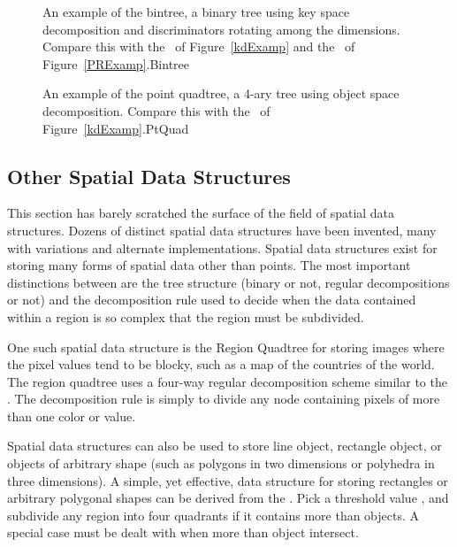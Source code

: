 \begin{figure}
\vspace{-\bigskipamount}
{An example of the bintree, a binary tree using key space
decomposition and discriminators rotating among the dimensions.
Compare this with the \KDtree\ of Figure~\ref{kdExamp} and the
\PRquad\ of Figure~\ref{PRExamp}.}{Bintree}
\bigskip
\end{figure}

\begin{figure}
\vspace{-\bigskipamount}
\vspace{-\medskipamount}
{An example of the point quadtree, a 4-ary tree using object space
decomposition.
Compare this with the \PRquad\ of Figure~\ref{kdExamp}.}{PtQuad}
\smallskip
\end{figure}

\newpage

\subsection{Other Spatial Data Structures}
\label{OtherSpatial}

This section has barely scratched the surface of the field of spatial
data structures.
Dozens of distinct spatial data structures have been
invented, many with variations and alternate implementations.
Spatial data structures exist for storing many forms of spatial data
other than points.
The most important distinctions between are the tree structure
(binary or not, regular decompositions or not) and the decomposition
rule used to decide when the data contained within a region is so
complex that the region must be subdivided.

One such spatial data structure is the Region
Quadtree for storing images where the pixel values tend to be
blocky, such as a map of the countries of the world.
The region quadtree uses a four-way regular decomposition scheme
similar to the \PRquad.
The decomposition rule is simply to divide any node containing pixels
of more than one color or value.

Spatial data structures can also be used to store line object,
rectangle object, or objects of arbitrary shape (such as polygons in
two dimensions or polyhedra in three dimensions).
A simple, yet effective, data structure for storing rectangles or
arbitrary polygonal shapes can be derived from the \PRquad.
Pick a threshold value , and subdivide any region into four
quadrants if it contains more than  objects.
A special case must be dealt with when more than  object
intersect.

